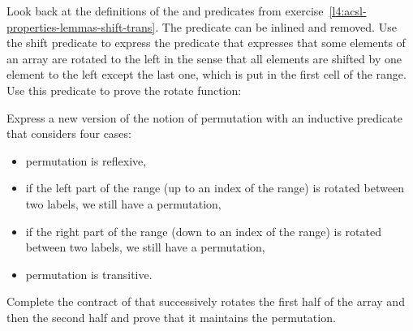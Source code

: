 

Look back at the definitions of the  and 
predicates from exercise~\ref{l4:acsl-properties-lemmas-shift-trans}. The
 predicate can be inlined and removed. Use the
shift predicate to express the  predicate that expresses that
some elements of an array are rotated to the left in the sense that all elements
are shifted by one element to the left except the last one, which is put in the
first cell of the range. Use this predicate to prove the rotate function:




Express a new version of the notion of permutation with an inductive predicate
that considers four cases:
\begin{itemize}
\item permutation is reflexive,
\item if the left part of the range (up to an index of the range) is rotated
  between two labels, we still have a permutation,
\item if the right part of the range (down to an index of the range) is rotated
  between two labels, we still have a permutation,
\item permutation is transitive.
\end{itemize}




Complete the contract of  that successively rotates the
first half of the array and then the second half and prove that it maintains the
permutation.




